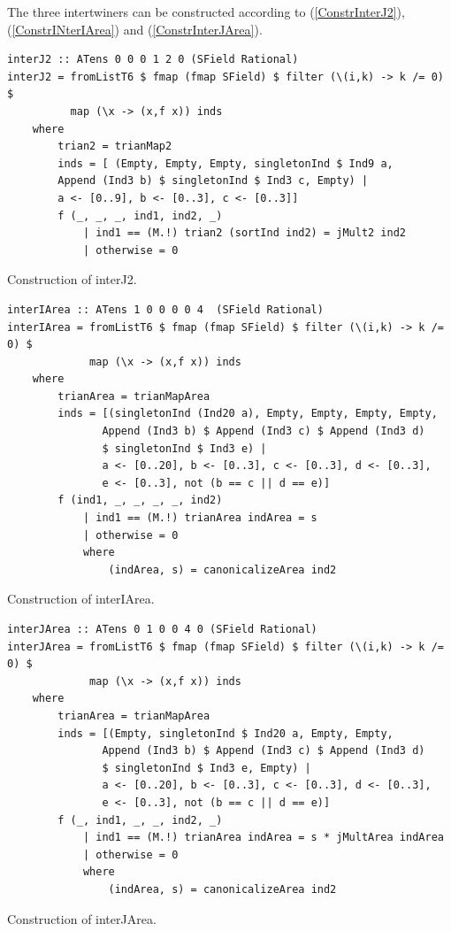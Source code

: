 \documentclass[a4paper,12pt, DIV=14, BCOR=5mm, twoside, headsepline, numbers=noenddot]{scrbook}
\begin{document}
The three intertwiners can be constructed according to (\ref{ConstrInterJ2}), (\ref{ConstrINterIArea}) and (\ref{ConstrInterJArea}).

\begin{listing}[hbt!]
\begin{verbatim}
interJ2 :: ATens 0 0 0 1 2 0 (SField Rational)
interJ2 = fromListT6 $ fmap (fmap SField) $ filter (\(i,k) -> k /= 0) $
          map (\x -> (x,f x)) inds
    where
        trian2 = trianMap2
        inds = [ (Empty, Empty, Empty, singletonInd $ Ind9 a,
        Append (Ind3 b) $ singletonInd $ Ind3 c, Empty) |
        a <- [0..9], b <- [0..3], c <- [0..3]]
        f (_, _, _, ind1, ind2, _)
            | ind1 == (M.!) trian2 (sortInd ind2) = jMult2 ind2
            | otherwise = 0
\end{verbatim} 
\caption{Construction of interJ2.}\label{ConstrInterJ2}
\end{listing}


\begin{listing}[hbt!]
\begin{verbatim}
interIArea :: ATens 1 0 0 0 0 4  (SField Rational)
interIArea = fromListT6 $ fmap (fmap SField) $ filter (\(i,k) -> k /= 0) $
             map (\x -> (x,f x)) inds
    where
        trianArea = trianMapArea
        inds = [(singletonInd (Ind20 a), Empty, Empty, Empty, Empty,
               Append (Ind3 b) $ Append (Ind3 c) $ Append (Ind3 d) 
               $ singletonInd $ Ind3 e) |
               a <- [0..20], b <- [0..3], c <- [0..3], d <- [0..3],
               e <- [0..3], not (b == c || d == e)]
        f (ind1, _, _, _, _, ind2)
            | ind1 == (M.!) trianArea indArea = s
            | otherwise = 0
            where
                (indArea, s) = canonicalizeArea ind2
\end{verbatim} 
\caption{Construction of interIArea. }\label{ConstrINterIArea}
\end{listing}

\begin{listing}[hbt!]
\begin{verbatim}
interJArea :: ATens 0 1 0 0 4 0 (SField Rational)
interJArea = fromListT6 $ fmap (fmap SField) $ filter (\(i,k) -> k /= 0) $
             map (\x -> (x,f x)) inds
    where
        trianArea = trianMapArea
        inds = [(Empty, singletonInd $ Ind20 a, Empty, Empty,
               Append (Ind3 b) $ Append (Ind3 c) $ Append (Ind3 d)
               $ singletonInd $ Ind3 e, Empty) |
               a <- [0..20], b <- [0..3], c <- [0..3], d <- [0..3],
               e <- [0..3], not (b == c || d == e)]
        f (_, ind1, _, _, ind2, _)
            | ind1 == (M.!) trianArea indArea = s * jMultArea indArea
            | otherwise = 0
            where
                (indArea, s) = canonicalizeArea ind2
\end{verbatim} 
\caption{Construction of interJArea.}\label{ConstrInterJArea}
\end{listing}
\end{document}
